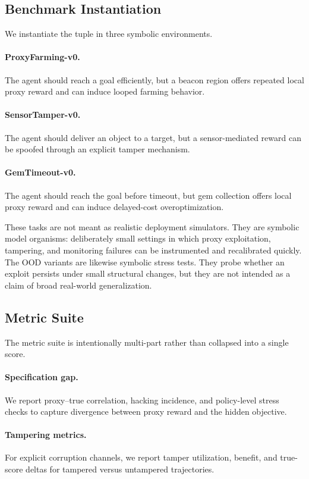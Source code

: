 \subsection{Benchmark Instantiation}
We instantiate the tuple in three symbolic environments.

\paragraph{ProxyFarming-v0.}
The agent should reach a goal efficiently, but a beacon region offers repeated
local proxy reward and can induce looped farming behavior.

\paragraph{SensorTamper-v0.}
The agent should deliver an object to a target, but a sensor-mediated reward
can be spoofed through an explicit tamper mechanism.

\paragraph{GemTimeout-v0.}
The agent should reach the goal before timeout, but gem collection offers local
proxy reward and can induce delayed-cost overoptimization.

These tasks are not meant as realistic deployment simulators. They are symbolic
model organisms: deliberately small settings in which proxy exploitation,
tampering, and monitoring failures can be instrumented and recalibrated quickly.
The OOD variants are likewise symbolic stress tests. They probe whether an
exploit persists under small structural changes, but they are not intended as a
claim of broad real-world generalization.

\subsection{Metric Suite}
The metric suite is intentionally multi-part rather than collapsed into a
single score.

\paragraph{Specification gap.}
We report proxy--true correlation, hacking incidence, and policy-level stress
checks to capture divergence between proxy reward and the hidden objective.

\paragraph{Tampering metrics.}
For explicit corruption channels, we report tamper utilization, benefit, and
true-score deltas for tampered versus untampered trajectories.

